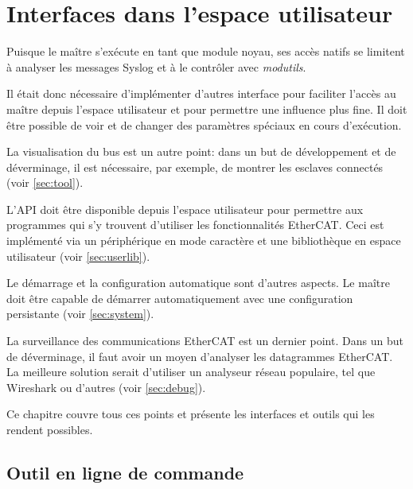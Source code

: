 \documentclass[a4paper,12pt,BCOR6mm,bibtotoc,idxtotoc]{scrbook}
\begin{document}

\chapter{Interfaces dans l'espace utilisateur}
\label{sec:user}

Puisque le ma\^itre s'ex\'ecute en tant que module noyau, ses acc\`es
natifs se limitent \`a analyser les messages Syslog et \`a le
contr\^oler avec \textit{modutils}.

Il \'etait donc n\'ecessaire d'impl\'ementer d'autres interface pour
faciliter l'acc\`es au ma\^itre depuis l'espace utilisateur et pour
permettre une influence plus fine. Il doit \^etre possible de voir et
de changer des param\`etres sp\'eciaux en cours d'ex\'ecution.

La visualisation du bus est un autre point: dans un but de
d\'eveloppement et de d\'everminage, il est n\'ecessaire, par
exemple, de montrer les esclaves connect\'es (voir
\autoref{sec:tool}).

L'API doit \^etre disponible depuis l'espace utilisateur pour
permettre aux programmes qui s'y trouvent d'utiliser les
fonctionnalit\'es EtherCAT.  Ceci est impl\'ement\'e via un
p\'eriph\'erique en mode caract\`ere et une biblioth\`eque en espace
utilisateur (voir \autoref{sec:userlib}).

Le d\'emarrage et la configuration automatique sont d'autres aspects.
Le ma\^itre doit \^etre capable de d\'emarrer automatiquement avec une
configuration persistante (voir \autoref{sec:system}).

La surveillance des communications EtherCAT est un dernier point.
Dans un but de d\'everminage, il faut avoir un moyen d'analyser les
datagrammes EtherCAT.  La meilleure solution serait d'utiliser un
analyseur r\'eseau populaire, tel que Wireshark \cite{wireshark} ou
d'autres (voir \autoref{sec:debug}).

Ce chapitre couvre tous ces points et pr\'esente les interfaces et
outils qui les rendent possibles.


\section{Outil en ligne de commande}
\label{sec:tool}

\end{document}
